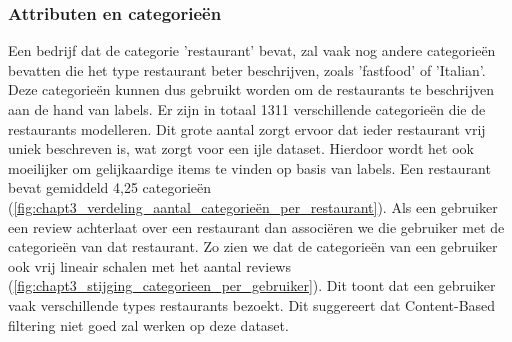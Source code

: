 \subsubsection{Attributen en categorieën}
Een bedrijf dat de categorie 'restaurant' bevat, zal vaak nog andere categorieën bevatten die het type restaurant beter beschrijven, zoals 'fastfood' of 'Italian'. Deze categorieën kunnen dus gebruikt worden om de restaurants te beschrijven aan de hand van labels. Er zijn in totaal 1311 verschillende categorieën die de restaurants modelleren. Dit grote aantal zorgt ervoor dat ieder restaurant vrij uniek beschreven is, wat zorgt voor een ijle dataset. Hierdoor wordt het ook moeilijker om gelijkaardige items te vinden op basis van labels. Een restaurant bevat gemiddeld 4,25 categorieën (\autoref{fig:chapt3_verdeling_aantal_categorieën_per_restaurant}).\newline
Als een gebruiker een review achterlaat over een restaurant dan associëren we die gebruiker met de categorieën van dat restaurant. Zo zien we dat de categorieën van een gebruiker ook vrij lineair schalen met het aantal reviews (\autoref{fig:chapt3_stijging_categorieen_per_gebruiker}). Dit toont dat een gebruiker vaak verschillende types restaurants bezoekt. Dit suggereert dat Content-Based filtering niet goed zal werken op deze dataset.


